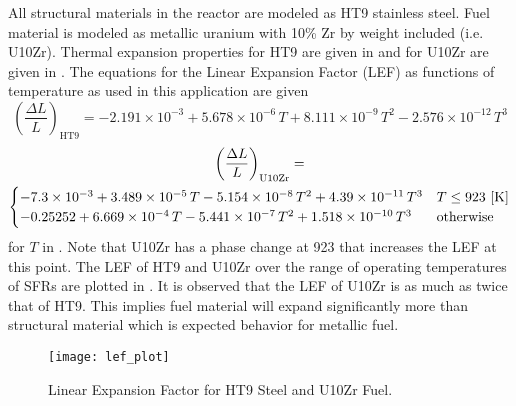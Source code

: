   All structural materials in the reactor are modeled as HT9 stainless steel.
  Fuel material is modeled as metallic uranium with 10\% Zr by weight included
  (i.e. U10Zr). Thermal expansion properties for HT9 are given in \cite{ht9Prop}
  and for U10Zr are given in \cite{thexpU10Zr}. The equations for the Linear
  Expansion Factor (LEF) as functions of temperature as used in this application 
  are given
  \begin{equation}
    \label{eq:lef_ht9}
    \left( \frac{\Delta L}{L} \right)_{\text{HT9}} = 
      -2.191 \times 10^{-3} + 5.678 \times 10^{-6} \, T + 
      8.111 \times 10^{-9} \, T^2 - 2.576 \times 10^{-12} \, T^3 
  \end{equation}
  \begin{multline}
    \label{eq:lef_u10zr}
    \left( \frac{\Delta L}{L} \right)_{\text{U10Zr}} = \\
      \begin{cases}
        -7.3 \times 10^{-3} + 3.489 \times 10^{-5} \, T 
          - 5.154 \times 10^{-8} \, T^2 + 4.39 \times 10^{-11} \, T^3 & 
          T \le 923 \,\left[\text{{K}}\right] \\
        -0.25252 + 6.669 \times 10^{-4} \, T - 5.441 \times 10^{-7} \, T^2 
          + 1.518 \times 10^{-10} \, T^3 & \text{otherwise}
      \end{cases}
  \end{multline}
  for $T$ in . Note that U10Zr has a phase change at 923  that 
  increases the LEF at this point. The LEF of HT9 and U10Zr over the range of
  operating temperatures of SFRs are plotted in .  It is 
  observed that the LEF of U10Zr is as much as twice that of HT9. This implies
  fuel material will expand significantly more than structural material which is
  expected behavior for metallic fuel.

  \begin{figure}
    \centering
    \texttt{[image: lef\_plot]}
    \caption{Linear Expansion Factor for HT9 Steel and U10Zr Fuel.}
    \label{fig:lef_plot}
  \end{figure}

